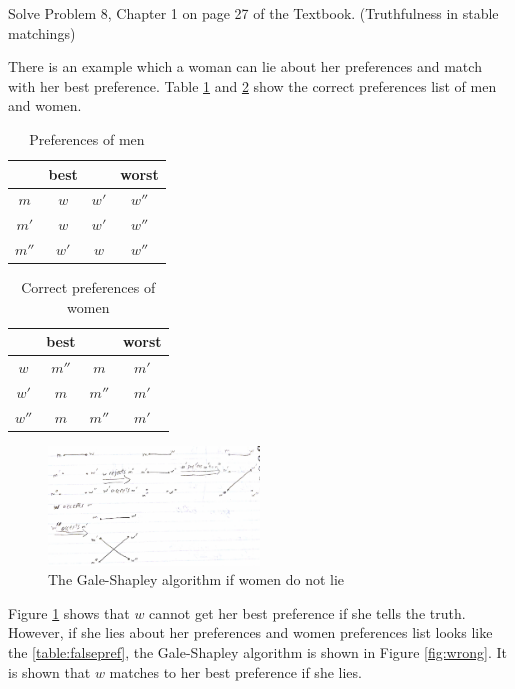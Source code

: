 \documentclass[12pt]{article}
\newenvironment{solution}[2][Solution]{\begin{trivlist}
\item[\hskip \labelsep {\bfseries #1}]}{\end{trivlist}}
\newenvironment{problem}[2][Problem]{\begin{trivlist}
\item[\hskip \labelsep {\bfseries #1}\hskip \labelsep {\bfseries #2.}]}{\end{trivlist}}
\begin{document}
\begin{problem}{4}
Solve Problem 8, Chapter 1 on page 27 of the Textbook. (Truthfulness in stable matchings)
\end{problem}

\begin{solution}{}
There is an example which a woman can lie about her preferences and match with her
best preference. Table \ref{table:menpref} and \ref{table:truepref} show the correct preferences list of
men and women.

\begin{table}[H]
\centering
\begin{tabular}{ |c|c|c|c| } 
 \hline
 & best & & worst \\
 \hline
 $m$ & $w$ & $w'$ & $w''$ \\ 
 \hline
 $m'$ & $w$ & $w'$ & $w''$ \\ 
 \hline
 $m''$ & $w'$ & $w$ & $w''$ \\ 
 \hline
\end{tabular}
\caption{Preferences of men}
\label{table:menpref}
\end{table}

\begin{table}[h!]
\centering
\begin{tabular}{ |c|c|c|c| } 
 \hline
 & best & & worst \\
 \hline
 $w$ & $m''$ & $m$ & $m'$ \\ 
 \hline
 $w'$ & $m$ & $m''$ & $m'$ \\ 
 \hline
 $w''$ & $m$ & $m''$ & $m'$ \\ 
 \hline
\end{tabular}
\caption{Correct preferences of women}
\label{table:truepref}
\end{table}

\begin{figure}[H]
 \centering
 \includegraphics[width=0.50\textwidth]{fig2.pdf}
 \caption{The Gale-Shapley algorithm if women do not lie
 \label{fig:true}}
\end{figure}

Figure \ref{fig:true} shows that $w$ cannot get her best preference if she tells the truth.
However, if she lies about her preferences and women preferences list looks like the \ref{table:falsepref},
the Gale-Shapley algorithm is shown in Figure \ref{fig:wrong}. It is shown that $w$ matches to her
best preference if she lies.


\end{solution}
\end{document}
